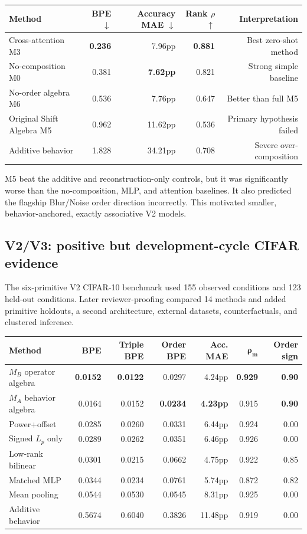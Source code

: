 \documentclass[11pt,a4paper]{article}
\begin{document}
\begin{center}
\begin{tabular}{lrrrr}
\toprule
\textbf{Method} & \textbf{BPE $\downarrow$} & \textbf{Accuracy MAE $\downarrow$} & \textbf{Rank $\rho$ $\uparrow$} & \textbf{Interpretation}\\
\midrule
Cross-attention M3 & \textbf{0.236} & 7.96pp & \textbf{0.881} & Best zero-shot method\\
No-composition M0 & 0.381 & \textbf{7.62pp} & 0.821 & Strong simple baseline\\
No-order algebra M6 & 0.536 & 7.76pp & 0.647 & Better than full M5\\
Original Shift Algebra M5 & 0.962 & 11.62pp & 0.536 & Primary hypothesis failed\\
Additive behavior & 1.828 & 34.21pp & 0.708 & Severe over-composition\\
\bottomrule
\end{tabular}
\end{center}

M5 beat the additive and reconstruction-only controls, but it was significantly
worse than the no-composition, MLP, and attention baselines.  It also predicted
the flagship Blur/Noise order direction incorrectly.  This motivated smaller,
behavior-anchored, exactly associative V2 models.

\subsection{V2/V3: positive but development-cycle CIFAR evidence}

The six-primitive V2 CIFAR-10 benchmark used 155 observed conditions and 123
held-out conditions.  Later reviewer-proofing compared 14 methods and added
primitive holdouts, a second architecture, external datasets, counterfactuals,
and clustered inference.

\begin{center}
\small
\begin{tabular}{lrrrrrr}
\toprule
\textbf{Method} & \textbf{BPE} & \textbf{Triple BPE} & \textbf{Order BPE} & \textbf{Acc. MAE} & $\bm{\rho_m}$ & \textbf{Order sign}\\
\midrule
$M_B$ operator algebra & \textbf{0.0152} & \textbf{0.0122} & 0.0297 & 4.24pp & \textbf{0.929} & \textbf{0.90}\\
$M_A$ behavior algebra & 0.0164 & 0.0152 & \textbf{0.0234} & \textbf{4.23pp} & 0.915 & \textbf{0.90}\\
Power+offset & 0.0285 & 0.0260 & 0.0331 & 6.44pp & 0.924 & 0.00\\
Signed $L_p$ only & 0.0289 & 0.0262 & 0.0351 & 6.46pp & 0.926 & 0.00\\
Low-rank bilinear & 0.0301 & 0.0215 & 0.0662 & 4.75pp & 0.922 & 0.85\\
Matched MLP & 0.0344 & 0.0234 & 0.0761 & 5.74pp & 0.872 & 0.82\\
Mean pooling & 0.0544 & 0.0530 & 0.0545 & 8.31pp & 0.925 & 0.00\\
Additive behavior & 0.5674 & 0.6040 & 0.3826 & 11.48pp & 0.919 & 0.00\\
\bottomrule
\end{tabular}
\end{center}
\end{document}
